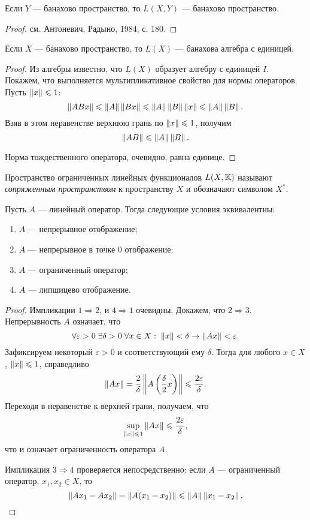 \begin{theorem}
    Если $Y$ --- банахово пространство, то $L(X, Y)$ --- банахово
    пространство.
\end{theorem}

\begin{proof}
   см. Антоневич, Радыно, 1984, с. 180. 
\end{proof}

\begin{corollaryth}
   Если $X$ --- банахово пространство, то $L(X)$ --- банахова алгебра с единицей.
\end{corollaryth}

\begin{proof}
    Из алгебры известно, что $L(X)$ образует алгебру с единицей $I$. Покажем, что выполняется
    мультипликативное свойство для нормы операторов. Пусть $\left\|x\right\| \leqslant 1$:
    \[ \left\|ABx\right\| \leqslant \left\|A\right\|\left\|Bx\right\| \leqslant \left\|A\right\|\left\|B\right\|\left\|x\right\| \leqslant \left\|A\right\|\left\|B\right\|. \]
    Взяв в этом неравенстве верхнюю грань по $\left\|x\right\| \leqslant 1$, получим
    \[ \left\|AB\right\| \leqslant \left\|A\right\|\left\|B\right\|. \]

    Норма тождественного оператора, очевидно, равна единице.
\end{proof}

\begin{definition}
    Пространство ограниченных линейных функционалов $L(X, \mathbb{K})$ называют
    \emph{сопряженным пространством} к пространству $X$ и обозначают символом $X^*$.
\end{definition}

\begin{theorem}
    Пусть $A$ --- линейный оператор. Тогда следующие условия эквивалентны:
    \begin{enumerate}
        \item $A$ --- непрерывное отображение;
        \item $A$ --- непрерывное в точке $0$ отображение;
        \item $A$ --- ограниченный оператор;
        \item $A$ --- липшицево отображение.
    \end{enumerate}
\end{theorem}

\begin{proof}
    Импликации $1 \Rightarrow 2$, и $4 \Rightarrow 1$ очевидны.
    Докажем, что $2 \Rightarrow 3$.
    Непрерывность $A$ означает, что
    \[ \forall \varepsilon > 0 \; \exists \delta > 0 \; \forall x \in X: \; \left\|x\right\| <
    \delta \rightarrow \left\|Ax\right\| < \varepsilon. \]
    Зафиксируем некоторый $\varepsilon > 0$ и соответствующий ему $\delta$.
    Тогда для любого $x \in X$, $\left\|x\right\| \leqslant
    1$, справедливо
    \[ \left\|Ax\right\| = \frac{2}{\delta} \left\|A\left( \frac{\delta}{2} x \right)\right\|
    \leqslant \frac{2\varepsilon}{\delta}. \]
    Переходя в неравенстве к верхней грани, получаем, что
    \[ \sup_{\left\|x\right\| \leqslant 1}\left\|Ax\right\| \leqslant \frac{2\varepsilon}{\delta}, \]
    что и означает ограниченность оператора $A$.

    Импликация $3 \Rightarrow 4$ проверяется непосредственно: если $A$ ---
    ограниченный оператор, $x_1, x_2 \in X$, то
    \[ \left\|Ax_1 - Ax_2\right\| = \left\|A(x_1 - x_2)\right\| \leqslant \left\|A\right\| \left\|x_1 - x_2\right\|.
    \]
\end{proof}
